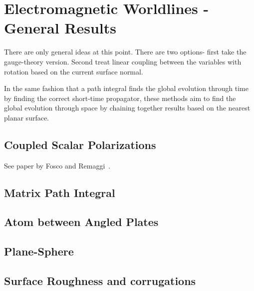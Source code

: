 \chapter{Electromagnetic Worldlines - General Results}
\label{ch:general}
There are only general ideas at this point.
There are two options- first take the gauge-theory version.
Second treat linear coupling between the variables with rotation based on the current surface normal.

In the same fashion that a path integral finds the global evolution through time by finding the correct short-time
propagator, these methods aim to find the global evolution through space by chaining together
results based on the nearest planar surface.  

\section{Coupled Scalar Polarizations}

See paper by Fosco and Remaggi~\cite{Fosco2012}.


\section{Matrix Path Integral}

    \section{Atom between Angled Plates}
    \section{Plane-Sphere}
    \section{Surface Roughness and corrugations}

